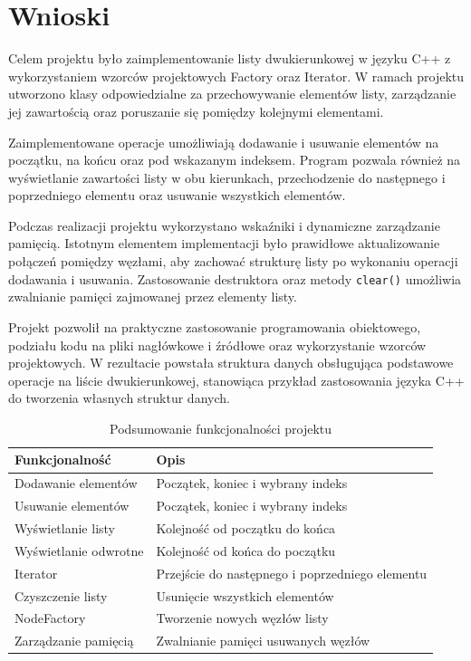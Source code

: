 \newpage
\section{Wnioski}

Celem projektu było zaimplementowanie listy dwukierunkowej w języku C++ z wykorzystaniem wzorców projektowych Factory oraz Iterator. W ramach projektu utworzono klasy odpowiedzialne za przechowywanie elementów listy, zarządzanie jej zawartością oraz poruszanie się pomiędzy kolejnymi elementami.

Zaimplementowane operacje umożliwiają dodawanie i usuwanie elementów na początku, na końcu oraz pod wskazanym indeksem. Program pozwala również na wyświetlanie zawartości listy w obu kierunkach, przechodzenie do następnego i poprzedniego elementu oraz usuwanie wszystkich elementów.

Podczas realizacji projektu wykorzystano wskaźniki i dynamiczne zarządzanie pamięcią. Istotnym elementem implementacji było prawidłowe aktualizowanie połączeń pomiędzy węzłami, aby zachować strukturę listy po wykonaniu operacji dodawania i usuwania. Zastosowanie destruktora oraz metody \texttt{clear()} umożliwia zwalnianie pamięci zajmowanej przez elementy listy.

Projekt pozwolił na praktyczne zastosowanie programowania obiektowego, podziału kodu na pliki nagłówkowe i źródłowe oraz wykorzystanie wzorców projektowych. W rezultacie powstała struktura danych obsługująca podstawowe operacje na liście dwukierunkowej, stanowiąca przykład zastosowania języka C++ do tworzenia własnych struktur danych.
\begin{table}[h]
\centering
\caption{Podsumowanie funkcjonalności projektu}
\begin{tabular}{|l|l|}
\hline
\textbf{Funkcjonalność} & \textbf{Opis} \\ \hline
Dodawanie elementów & Początek, koniec i wybrany indeks \\ \hline
Usuwanie elementów & Początek, koniec i wybrany indeks \\ \hline
Wyświetlanie listy & Kolejność od początku do końca \\ \hline
Wyświetlanie odwrotne & Kolejność od końca do początku \\ \hline
Iterator & Przejście do następnego i poprzedniego elementu \\ \hline
Czyszczenie listy & Usunięcie wszystkich elementów \\ \hline
NodeFactory & Tworzenie nowych węzłów listy \\ \hline
Zarządzanie pamięcią & Zwalnianie pamięci usuwanych węzłów \\ \hline
\end{tabular}
\label{tab:podsumowanie-funkcjonalnosci}
\end{table}